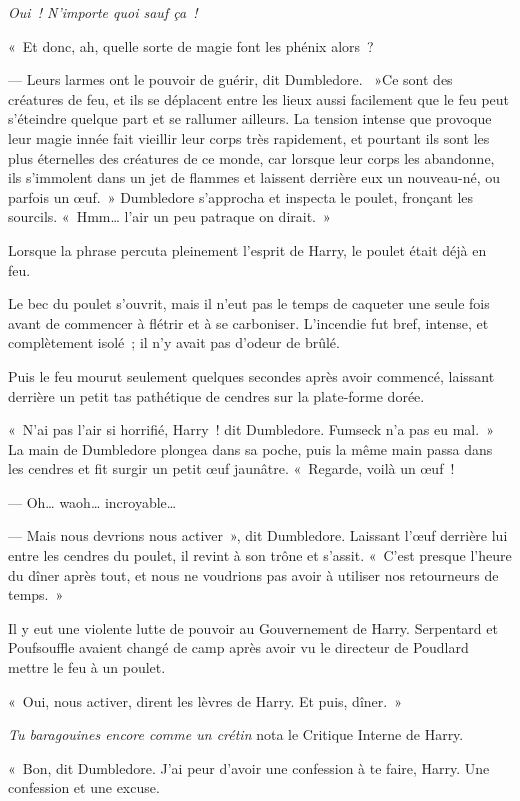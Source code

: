 \emph{Oui~! N'importe quoi sauf ça~!}

«~Et donc, ah, quelle sorte de magie font les phénix alors~?

--- Leurs larmes ont le pouvoir de guérir, dit Dumbledore. ~»Ce sont des créatures de feu, et ils se déplacent entre les lieux aussi facilement que le feu peut s'éteindre quelque part et se rallumer ailleurs. La tension intense que provoque leur magie innée fait vieillir leur corps très rapidement, et pourtant ils sont les plus éternelles des créatures de ce monde, car lorsque leur corps les abandonne, ils s'immolent dans un jet de flammes et laissent derrière eux un nouveau-né, ou parfois un œuf.~» Dumbledore s'approcha et inspecta le poulet, fronçant les sourcils. «~Hmm… l'air un peu patraque on dirait.~»

Lorsque la phrase percuta pleinement l'esprit de Harry, le poulet était déjà en feu.

Le bec du poulet s'ouvrit, mais il n'eut pas le temps de caqueter une seule fois avant de commencer à flétrir et à se carboniser. L'incendie fut bref, intense, et complètement isolé~; il n'y avait pas d'odeur de brûlé.

Puis le feu mourut seulement quelques secondes après avoir commencé, laissant derrière un petit tas pathétique de cendres sur la plate-forme dorée.

«~N'ai pas l'air si horrifié, Harry~! dit Dumbledore. Fumseck n'a pas eu mal.~» La main de Dumbledore plongea dans sa poche, puis la même main passa dans les cendres et fit surgir un petit œuf jaunâtre. «~Regarde, voilà un œuf~!

--- Oh… waoh… incroyable…

--- Mais nous devrions nous activer~», dit Dumbledore. Laissant l'œuf derrière lui entre les cendres du poulet, il revint à son trône et s'assit. «~C'est presque l'heure du dîner après tout, et nous ne voudrions pas avoir à utiliser nos retourneurs de temps.~»

Il y eut une violente lutte de pouvoir au Gouvernement de Harry. Serpentard et Poufsouffle avaient changé de camp après avoir vu le directeur de Poudlard mettre le feu à un poulet.

«~Oui, nous activer, dirent les lèvres de Harry. Et puis, dîner.~»

\emph{Tu baragouines encore comme un crétin} nota le Critique Interne de Harry.

«~Bon, dit Dumbledore. J'ai peur d'avoir une confession à te faire, Harry. Une confession et une excuse.

